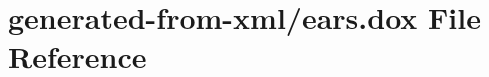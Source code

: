 \hypertarget{ears_8dox}{}\section{generated-\/from-\/xml/ears.dox File Reference}
\label{ears_8dox}
